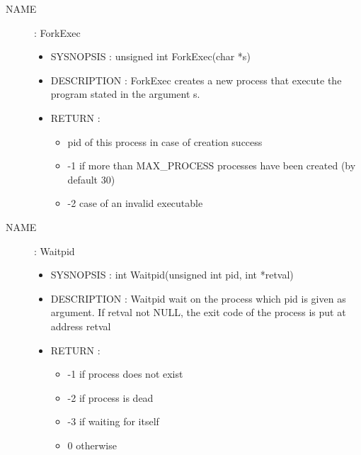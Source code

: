 \documentclass[a4paper,10pt]{article}
\begin{document}
\begin{description}
    \item [NAME] : ForkExec
        \begin{itemize}
            \item SYSNOPSIS : unsigned int ForkExec(char *s)
            \item DESCRIPTION :
                ForkExec creates a new process that execute the program stated in the argument s.
            \item RETURN :
                \begin{itemize}
                    \item pid of this process in case of creation success
                    \item -1 if more than MAX\_PROCESS processes have been created (by default 30)
                    \item -2 case of an invalid executable
                \end{itemize}
        \end{itemize}

    \item [NAME] : Waitpid
        \begin{itemize}
            \item SYSNOPSIS : int Waitpid(unsigned int pid, int *retval)
            \item DESCRIPTION :
                Waitpid wait on the process which pid is given as argument.
                If retval not NULL, the exit code of the process is put at address retval
            \item RETURN :
                \begin{itemize}
                    \item -1 if process does not exist
                    \item -2 if process is dead
                    \item -3 if waiting for itself
                    \item 0 otherwise
                \end{itemize}
        \end{itemize}


\end{description}
\end{document}
